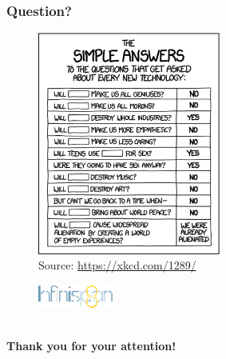 \documentclass[10pt,utf8]{beamer}
\begin{document}
\begin{frame}
	\frametitle{Question?}
	\begin{figure}
		\centering
		\includegraphics[width=6cm]{./img/simple_answers.eps}
		\caption{\tiny{Source: \url{https://xkcd.com/1289/}}}
	\end{figure}
\end{frame}

\begin{frame}
	\begin{figure}
		\centering
		\includegraphics[width=2.5cm]{./img/infinispan8.eps}
	\end{figure}
	\centering
	\large{} \\
	\vspace{1cm}
	\huge{\textbf{Thank you for your attention!}} \\
\end{frame}
\end{document}

